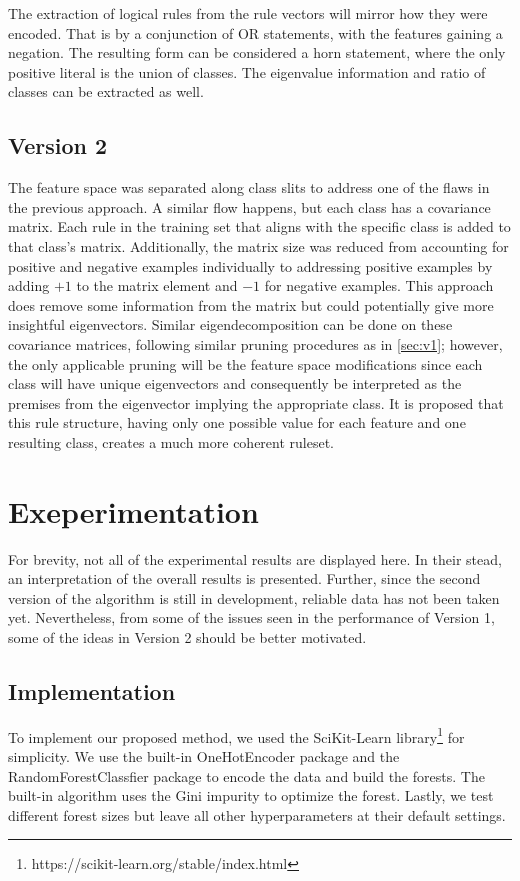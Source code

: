 \documentclass[11pt]{article}
\begin{document}
The extraction of logical rules from the rule vectors will mirror how they were encoded. That is by a conjunction of OR statements, with the features gaining a negation. The resulting form can be considered a horn statement, where the only positive literal is the union of classes. The eigenvalue information and ratio of classes can be extracted as well. 

\subsection{Version 2}
\label{sec:v2}
The feature space was separated along class slits to address one of the flaws in the previous approach. A similar flow happens, but each class has a covariance matrix. Each rule in the training set that aligns with the specific class is added to that class's matrix. Additionally, the matrix size was reduced from accounting for positive and negative examples individually to addressing positive examples by adding $+1$ to the matrix element and $-1$ for negative examples. This approach does remove some information from the matrix but could potentially give more insightful eigenvectors. Similar eigendecomposition can be done on these covariance matrices, following similar pruning procedures as in \ref{sec:v1}; however, the only applicable pruning will be the feature space modifications since each class will have unique eigenvectors and consequently be interpreted as the premises from the eigenvector implying the appropriate class. It is proposed that this rule structure, having only one possible value for each feature and one resulting class, creates a much more coherent ruleset.   

\section{Exeperimentation}
\label{sec:exp}
For brevity, not all of the experimental results are displayed here. In their stead, an interpretation of the overall results is presented. Further, since the second version of the algorithm is still in development, reliable data has not been taken yet. Nevertheless, from some of the issues seen in the performance of Version 1, some of the ideas in Version 2 should be better motivated.

\subsection{Implementation}
To implement our proposed method, we used the SciKit-Learn library\footnote{https://scikit-learn.org/stable/index.html} for simplicity. We use the built-in OneHotEncoder package and the RandomForestClassfier package to encode the data and build the forests. The built-in algorithm uses the Gini impurity to optimize the forest. Lastly, we test different forest sizes but leave all other hyperparameters at their default settings.
\end{document}
